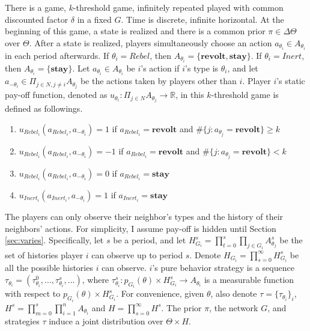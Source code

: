 \documentclass[12pt,letter]{article}
\theoremstyle{definition}
\theoremstyle{remark}
\theoremstyle{claim}
\begin{document}
There is a game, $k$-threshold game, infinitely repeated played with common discounted factor $\delta$ in a fixed $G$. Time is discrete, infinite horizontal. At the beginning of this game, a state is realized and there is a common prior $\pi\in \Delta \Theta$ over $\Theta$. After a state is realized, players simultaneously choose an action $a_{\theta_i}\in A_{\theta_i}$ in each period afterwards. If $\theta_i=Rebel$, then $A_{\theta_i}=\{\textbf{revolt}, \textbf{stay}\}$.  If $\theta_i=Inert$, then $A_{\theta_i}=\{\textbf{stay}\}$. Let $a_{\theta_i}\in A_{\theta_i}$ be $i$'s action if $i$'s type is $\theta_i$, and let $a_{-\theta_i}\in \Pi_{j\in N,j\neq i}A_{\theta_j}$ be the actions taken by players other than $i$. Player $i$'s static pay-off function, denoted as $u_{\theta_i}: \Pi_{j\in N}A_{\theta_j}\rightarrow \mathbb{R}$, in this $k$-threshold game is defined as followings. 
\begin{enumerate}
\item $u_{Rebel_i}(a_{Rebel_i},a_{-\theta_i})=1$ if $a_{Rebel_i}=\textbf{revolt}$ and $\#\{j:a_{\theta_j}=\textbf{revolt}\}\geq k$
\item $u_{Rebel_i}(a_{Rebel_i},a_{-\theta_i})=-1$ if $a_{Rebel_i}=\textbf{revolt}$ and $\#\{j:a_{\theta_j}=\textbf{revolt}\}< k$
\item $u_{Rebel_i}(a_{Rebel_i},a_{-\theta_i})=0$ if $a_{Rebel_i}=\textbf{stay}$
\item $u_{Inert_i}(a_{Inert_i},a_{-\theta_i})=1$ if $a_{Inert_i}=\textbf{stay}$
\end{enumerate}

The players can only observe their neighbor's types and the history of their neighbors' actions. For simplicity, I assume pay-off is hidden until Section \ref{sec:varies}. Specifically, let $s$ be a period, and let $H^s_{G_i}=\prod^s_{t=0}\prod_{j\in G_i}A^s_{\theta_j}$ be the set of histories player $i$ can observe up to period $s$. Denote $H_{G_i}=\prod^{\infty}_{s=0}H^s_{G_i}$ be all the possible histories $i$ can observe. $i$'s pure behavior strategy is a sequence $\tau_{\theta_i}=(\tau^0_{\theta_i},...,\tau^s_{\theta_i},...)$, where $\tau^s_{\theta_i}: p_{G_i}(\theta)\times H^s_{G_i}\rightarrow A_{\theta_i}$ is a  measurable function with respect to $p_{G_i}(\theta)\times H^s_{G_i}$. For convenience, given $\theta$, also denote $\tau=\{\tau_{\theta_i}\}_i$,  $H^s=\prod^s_{m=0}\prod^n_{i=1}A_{\theta_i}$ and $H=\prod^{\infty}_{s=0}H^s$. The prior $\pi$, the network $G$, and strategies $\tau$ induce a joint distribution over $\Theta\times H$. 
\end{document}
